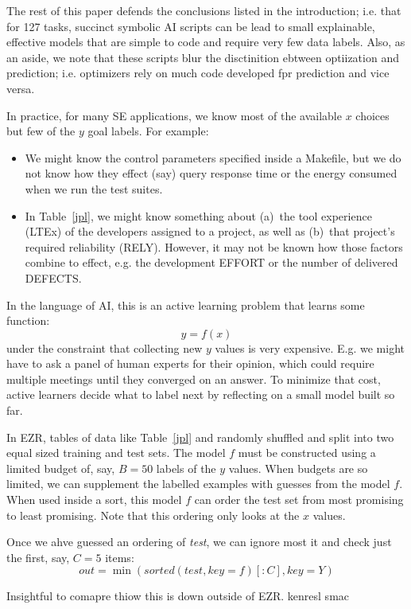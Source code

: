 \documentclass[AMA,STIX2COL]{WileyNJDv5}
\begin{document}
The rest of this paper defends the conclusions listed in the introduction;
i.e. that for 127 tasks, succinct symbolic AI scripts can be lead to small explainable, effective
models that are simple to code and require very few data labels.
Also, as an aside, we note that  these scripts blur the disctinition ebtween optiization and prediction; i.e. optimizers rely on much code developed
fpr prediction and vice versa.

In practice, for many SE applications, we know most of the available $x$ choices
 but few of the $y$ goal labels. For example:
 \begin{itemize}
 \item
 We might know  the control parameters specified
 inside a Makefile, but we do not know how they effect (say) query response time or
 the energy consumed when we run the test suites. 
 \item
 In  Table~\ref{jpl}, we might know something about (a)~the tool experience (LTEx) of
 the developers assigned to a project, as well as  (b)~that project's  required
 reliability (RELY). However, it may not be known how those factors combine to effect, e.g. 
 the development EFFORT or the number of delivered DEFECTS.
 \end{itemize}
 In the language of AI, this is an active learning problem that learns some function:
 \[
 y=f(x)
 \]
 under the constraint that collecting new $y$ values is very expensive. E.g. we might have to ask a panel of
 human experts for their opinion, which could require multiple meetings until they converged on an answer.
 To minimize that cost,
active learners decide what to label next by reflecting on a small  model built so far.

In EZR, 
tables of data like Table~\ref{jpl} and   randomly shuffled and split into two equal
sized training and test sets. The
model $f$ must be constructed using a limited budget of, say, $B=50$ labels of the $y$ values. When budgets are so limited, we can supplement
the labelled examples with guesses from the model $f$.
When used inside a sort, this model $f$ can order the test set from most promising to least promising. Note that this ordering only looks at the $x$ values.

Once we ahve guessed an ordering of {\em test}, we can ignore most  it and check  just the first, say, $C=5$ items:
\[
\mathit{out}= \min(\mathit{sorted}(\mathit{test},\mathit{key}=f)[:C], key=Y) 
\]
 

 Insightful to comapre thiow this is down outside of EZR. kenresl smac
 
\end{document}
